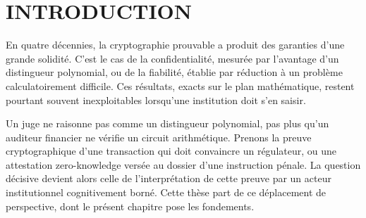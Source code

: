 
\section{INTRODUCTION}
\label{sec:introduction_contexte}

\begin{sloppypar}
En quatre d\'ecennies, la cryptographie prouvable a produit des garanties
d'une grande solidit\'e. C'est le cas de la confidentialit\'e, mesur\'ee par
l'avantage d'un distingueur polynomial, ou de la fiabilit\'e, \'etablie par
r\'eduction \`a un probl\`eme calculatoirement difficile. Ces r\'esultats,
exacts sur le plan math\'ematique, restent pourtant souvent inexploitables
lorsqu'une institution doit s'en saisir.

Un juge ne raisonne pas comme un distingueur polynomial, pas plus qu'un
auditeur financier ne v\'erifie un circuit arithm\'etique. Prenons la preuve
cryptographique d'une transaction qui doit convaincre un r\'egulateur, ou une
attestation zero-knowledge vers\'ee au dossier d'une instruction p\'enale.
La question d\'ecisive devient alors celle de l'interpr\'etation de cette preuve
par un acteur institutionnel cognitivement born\'e. Cette th\`ese part de ce d\'eplacement de
perspective, dont le pr\'esent chapitre pose les fondements.


\end{sloppypar}
